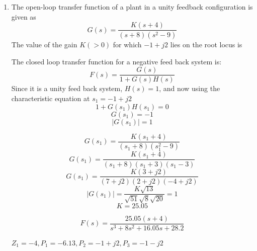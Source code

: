 \begin{enumerate}[label=\thesection.\arabic*.,ref=\thesection.\theenumi]

\item
 The open-loop transfer function of a plant in a unity feedback configuration is given as 
\begin{equation}
    G(s) = \dfrac{K(s+4)}{(s+8)(s^{2}-9)}
\end{equation}
 The value of the gain $K(>0)$ for which $-1 + j2$ lies on the root locus is
    
  

\solution
  The closed loop transfer function for a negative feed back system is:
  \begin{equation}
      F(s) = \dfrac{G(s)}{1+G(s)H(s)}
  \end{equation}
Since it is a unity feed back system, $H(s) = 1$, and now using the characteristic equation at $s_{1} = -1 + j2$
\begin{equation}
1 + G(s_{1})H(s_{1}) = 0
\end{equation}
\begin{equation}
 G(s_{1}) = -1
\end{equation}
\begin{equation}
 |G(s_{1})| = 1
\end{equation}


\begin{equation}
    G(s_{1}) = \dfrac{K(s_{1}+4)}{(s_{1}+8)(s_{1}^{2}-9)}
\end{equation}
\begin{equation}
    G(s_{1}) = \dfrac{K(s_{1}+4)}{(s_{1}+8)(s_{1}+3)(s_{1}-3)}
\end{equation}
\begin{equation}
    G(s_{1}) = \dfrac{K(3+j2)}{(7+j2)(2+j2)(-4+j2)}
\end{equation}
\begin{equation}
    |G(s_{1})| = \dfrac{K\sqrt{13}}{\sqrt{51}\sqrt{8}\sqrt{20}} = 1
\end{equation}
\begin{equation}
    K = 25.05
\end{equation}


\begin{equation}
    F(s) = \dfrac{25.05(s+4)}{s^{3}+8s^{2}+16.05s+28.2}
\end{equation}

    $Z_{1}=-4, P_{1}=-6.13, P_{2}=-1+j2, P_{3}=-1-j2$



\end{enumerate}
